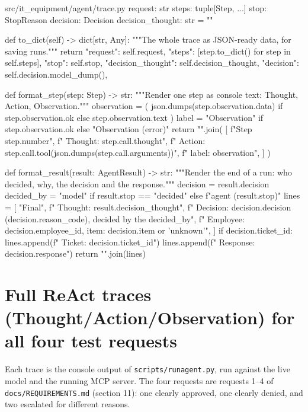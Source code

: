 \documentclass[11pt,letterpaper]{article}
\renewcommand{\_}{\textunderscore\allowbreak}
\begin{document}
\begin{codebox}{src/it_equipment/agent/trace.py}
    request: str
    steps: tuple[Step, ...]
    stop: StopReason
    decision: Decision
    decision_thought: str = ""

    def to_dict(self) -> dict[str, Any]:
        """The whole trace as JSON-ready data, for saving runs."""
        return {
            "request": self.request,
            "steps": [step.to_dict() for step in self.steps],
            "stop": self.stop,
            "decision_thought": self.decision_thought,
            "decision": self.decision.model_dump(),
        }


def format_step(step: Step) -> str:
    """Render one step as console text: Thought, Action, Observation."""
    observation = (
        json.dumps(step.observation.data) if step.observation.ok else step.observation.text
    )
    label = "Observation" if step.observation.ok else "Observation (error)"
    return "\n".join(
        [
            f"Step {step.number}",
            f"  Thought: {step.call.thought}",
            f"  Action: {step.call.tool}({json.dumps(step.call.arguments)})",
            f"  {label}: {observation}",
        ]
    )


def format_result(result: AgentResult) -> str:
    """Render the end of a run: who decided, why, the decision and the response."""
    decision = result.decision
    decided_by = "model" if result.stop == "decided" else f"agent ({result.stop})"
    lines = [
        "Final",
        f"  Thought: {result.decision_thought}",
        f"  Decision: {decision.decision} ({decision.reason_code}), decided by the {decided_by}",
        f"  Employee: {decision.employee_id}, item: {decision.item or 'unknown'}",
    ]
    if decision.ticket_id:
        lines.append(f"  Ticket: {decision.ticket_id}")
    lines.append(f"  Response: {decision.response}")
    return "\n".join(lines)
\end{codebox}

\newpage
\section{Full ReAct traces (Thought/Action/Observation) for all four test requests}

Each trace is the console output of \texttt{scripts/run\_agent.py}, run against the live model
and the running MCP server. The four requests are requests 1--4 of \texttt{docs/REQUIREMENTS.md}
(section 11): one clearly approved, one clearly denied, and two escalated for different reasons.
\end{document}
